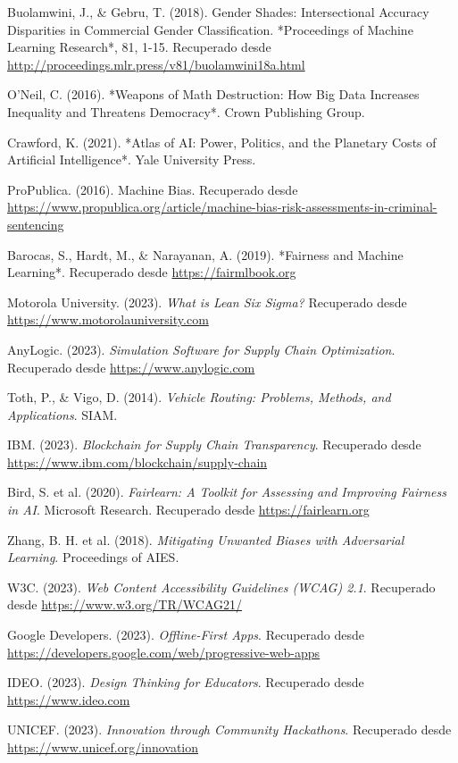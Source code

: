 \documentclass[12pt]{article}
\begin{document}
\begin{thebibliography}{9}

Buolamwini, J., \& Gebru, T. (2018). Gender Shades: Intersectional Accuracy Disparities in Commercial Gender Classification. *Proceedings of Machine Learning Research*, 81, 1-15. Recuperado desde \url{http://proceedings.mlr.press/v81/buolamwini18a.html}

O’Neil, C. (2016). *Weapons of Math Destruction: How Big Data Increases Inequality and Threatens Democracy*. Crown Publishing Group.

Crawford, K. (2021). *Atlas of AI: Power, Politics, and the Planetary Costs of Artificial Intelligence*. Yale University Press.

ProPublica. (2016). Machine Bias. Recuperado desde \url{https://www.propublica.org/article/machine-bias-risk-assessments-in-criminal-sentencing}

Barocas, S., Hardt, M., \& Narayanan, A. (2019). *Fairness and Machine Learning*. Recuperado desde \url{https://fairmlbook.org}

Motorola University. (2023). \textit{What is Lean Six Sigma?} Recuperado desde \url{https://www.motorolauniversity.com}

AnyLogic. (2023). \textit{Simulation Software for Supply Chain Optimization}. Recuperado desde \url{https://www.anylogic.com}

Toth, P., \& Vigo, D. (2014). \textit{Vehicle Routing: Problems, Methods, and Applications}. SIAM.

IBM. (2023). \textit{Blockchain for Supply Chain Transparency}. Recuperado desde \url{https://www.ibm.com/blockchain/supply-chain}

Bird, S. et al. (2020). \textit{Fairlearn: A Toolkit for Assessing and Improving Fairness in AI}. Microsoft Research. Recuperado desde \url{https://fairlearn.org}

Zhang, B. H. et al. (2018). \textit{Mitigating Unwanted Biases with Adversarial Learning}. Proceedings of AIES.

W3C. (2023). \textit{Web Content Accessibility Guidelines (WCAG) 2.1}. Recuperado desde \url{https://www.w3.org/TR/WCAG21/}

Google Developers. (2023). \textit{Offline-First Apps}. Recuperado desde \url{https://developers.google.com/web/progressive-web-apps}

IDEO. (2023). \textit{Design Thinking for Educators}. Recuperado desde \url{https://www.ideo.com}

UNICEF. (2023). \textit{Innovation through Community Hackathons}. Recuperado desde \url{https://www.unicef.org/innovation}

\end{thebibliography}


\end{document}
